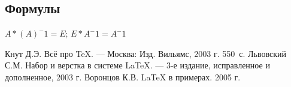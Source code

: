 \documentclass[12pt,a4paper]{scrartcl}
\begin{document}
\subsection{ Формулы}
\label{sec:mathexample}

 \(A*(A)^-1=E\);
\(E*A^-1=A^-1\)

\label{sec:picexample}
\begin{figure}[h]
	\centering
	
\end{figure}


\begin{thebibliography}{9}
Кнут Д.Э. Всё про \TeX. \newblock --- Москва: Изд. Вильямс, 2003 г. 550~с.
Львовский С.М. Набор и верстка в системе \LaTeX{}. \newblock --- 3-е издание, исправленное и дополненное, 2003 г.
Воронцов К.В. \LaTeX{} в примерах. 2005 г.
\end{thebibliography}
\end{document}
